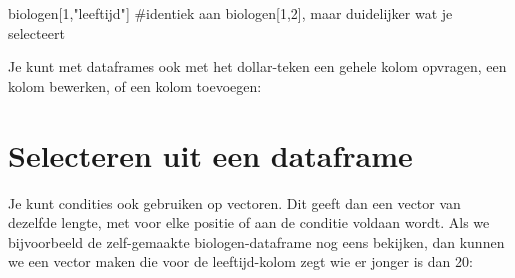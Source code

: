 \documentclass[
  a4paper,
]{scrbook}
\newenvironment{Shaded}{\begin{snugshade}}{\end{snugshade}}
\newcommand{\AttributeTok}[1]{\textcolor[rgb]{0.40,0.45,0.13}{#1}}
\newcommand{\CommentTok}[1]{\textcolor[rgb]{0.37,0.37,0.37}{#1}}
\newcommand{\DecValTok}[1]{\textcolor[rgb]{0.68,0.00,0.00}{#1}}
\newcommand{\FunctionTok}[1]{\textcolor[rgb]{0.28,0.35,0.67}{#1}}
\newcommand{\NormalTok}[1]{\textcolor[rgb]{0.00,0.23,0.31}{#1}}
\newcommand{\OtherTok}[1]{\textcolor[rgb]{0.00,0.23,0.31}{#1}}
\newcommand{\SpecialCharTok}[1]{\textcolor[rgb]{0.37,0.37,0.37}{#1}}
\newcommand{\StringTok}[1]{\textcolor[rgb]{0.13,0.47,0.30}{#1}}
\theoremstyle{definition}
\theoremstyle{remark}
\begin{document}
\begin{Shaded}
\begin{Highlighting}[]
\NormalTok{biologen[}\DecValTok{1}\NormalTok{,}\StringTok{"leeftijd"}\NormalTok{] }\CommentTok{\#identiek aan biologen[1,2], maar duidelijker wat je selecteert}
\end{Highlighting}
\end{Shaded}

Je kunt met dataframes ook met het dollar-teken een gehele kolom
opvragen, een kolom bewerken, of een kolom toevoegen:

\begin{Shaded}
\end{Shaded}

\hypertarget{selecteren-uit-een-dataframe}{%
\section{Selecteren uit een
dataframe}\label{selecteren-uit-een-dataframe}}

Je kunt condities ook gebruiken op vectoren. Dit geeft dan een vector
van dezelfde lengte, met voor elke positie of aan de conditie voldaan
wordt. Als we bijvoorbeeld de zelf-gemaakte biologen-dataframe nog eens
bekijken, dan kunnen we een vector maken die voor de leeftijd-kolom zegt
wie er jonger is dan 20:

\begin{Shaded}
\end{Shaded}
\end{document}

